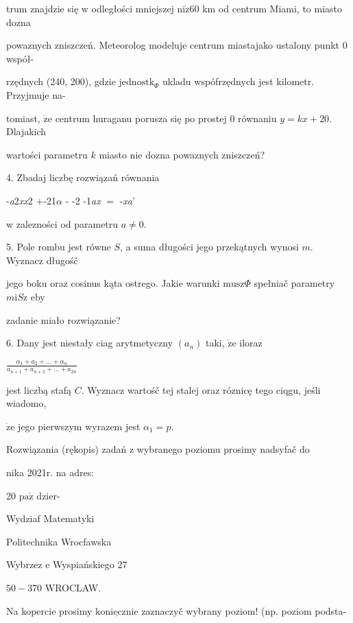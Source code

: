 \documentclass[a4paper,12pt]{article}
\begin{document}
trum znajdzie się $\mathrm{w}$ odległości mniejszej $\mathrm{n}\mathrm{i}\dot{\mathrm{z}}60$ km od centrum Miami, to miasto dozna

powaznych zniszczeń. Meteorolog modeluje centrum miastajako ustalony punkt $0$ współ-

rzędnych (240, 200), gdzie $\mathrm{j}\mathrm{e}\mathrm{d}\mathrm{n}\mathrm{o}\mathrm{s}\mathrm{t}\mathrm{k}_{\Phi}$ ukladu wspófrzędnych jest kilometr. Przyjmuje na-

tomiast, $\dot{\mathrm{z}}\mathrm{e}$ centrum huraganu porusza się po prostej $0$ równaniu $y=kx+20$. Dlajakich

wartości parametru $k$ miasto nie dozna powaznych zniszczeń?

4. Zbadaj liczbę rozwiązań równania

-{\it a}2{\it xx}2 $+$-21$\alpha$ - -2 -1{\it ax} $=$ -{\it xa}'

$\mathrm{w}$ zalezności od parametru $a\neq 0.$

5. Pole rombu jest równe $S$, a suma długości jego przekątnych wynosi $m$. Wyznacz długośč

jego boku oraz cosinus kąta ostrego. Jakie warunki $\mathrm{m}\mathrm{u}\mathrm{s}\mathrm{z}\Phi$ spełniač parametry $m\mathrm{i}S\dot{\mathrm{z}}$ eby

zadanie miało rozwiązanie?

6. Dany jest niestały ciag arytmetyczny $(a_{n})$ taki, $\dot{\mathrm{z}}\mathrm{e}$ iloraz

$\displaystyle \frac{\alpha_{1}+a_{2}+\ldots+\alpha_{n}}{a_{n+1}+a_{n+2}+\ldots+a_{2n}}$

jest liczbą stafą $C$. Wyznacz wartośč tej stalej oraz róznicę tego ciqgu, jeśli wiadomo,

$\dot{\mathrm{z}}\mathrm{e}$ jego pierwszym wyrazem jest $\alpha_{1}=p.$

Rozwiązania (rękopis) zadań z wybranego poziomu prosimy nadsyfač do

nika 2021r. na adres:

20 $\mathrm{p}\mathrm{a}\acute{\mathrm{z}}$ dzier-

Wydziaf Matematyki

Politechnika Wrocfawska

Wybrzez $\mathrm{e}$ Wyspiańskiego 27

$50-370$ WROCLAW.

Na kopercie prosimy $\underline{\mathrm{k}\mathrm{o}\mathrm{n}\mathrm{i}\mathrm{e}\mathrm{c}\mathrm{z}\mathrm{n}\mathrm{i}\mathrm{e}}$ zaznaczyč wybrany poziom! (np. poziom podsta-
\end{document}
